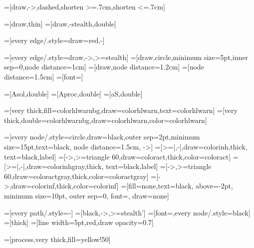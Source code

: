 =[draw,->,dashed,shorten >=.7cm,shorten <=.7cm]

=[draw,thin]%
=[draw,-stealth,double]

=[every edge/.style={draw=red,-}]

=[every edge/.style={draw,->,>=stealth}]
=[draw,circle,minimum size=5pt,inner sep=0,node distance=1cm]
=[draw,node distance=1.2cm]
=[node distance=1.5cm]
=[font=\Large]

=[Asol,double]
=[Aproc,double]
=[aS,double]

=[very thick,fill=colorhlwarnbg,draw=colorhlwarn,text=colorhlwarn]
=[very thick,double=colorhlwarnbg,draw=colorhlwarn,color=colorhlwarn]








=[every node/.style={circle,draw=black,outer sep=2pt,minimum
                size=15pt,text=black}, node distance=1.5cm, ->]
=[>=|,-|,draw=colorinh,thick, text=black,label]
=[->,>=triangle 60,draw=coloract,thick,color=coloract]
=[>=|,-|,draw=colorinhgray,thick, text=black,label]
=[->,>=triangle 60,draw=coloractgray,thick,color=coloractgray]
=[->,draw=colorinf,thick,color=colorinf]
=[fill=none,text=black, above=-2pt,%
minimum size=10pt, outer sep=0, font=\scriptsize, draw=none]


=[every path/.style={-}]
=[black,->,>=stealth']
=[font=\scriptsize,every node/.style={black}]
=[thick]
=[line width=5pt,red,draw opacity=0.7]


=[process,very thick,fill=yellow!50]
